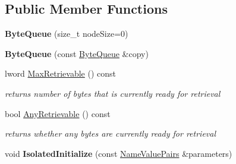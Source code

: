 \subsection*{Public Member Functions}
\begin{DoxyCompactItemize}
\item 
\hypertarget{class_byte_queue_a7c8239764938f1bb776280695e62fa0d}{
{\bfseries ByteQueue} (size\_\-t nodeSize=0)}
\label{class_byte_queue_a7c8239764938f1bb776280695e62fa0d}

\item 
\hypertarget{class_byte_queue_a0e3ec54d26a5be3b5689ca53a906622f}{
{\bfseries ByteQueue} (const \hyperlink{class_byte_queue}{ByteQueue} \&copy)}
\label{class_byte_queue_a0e3ec54d26a5be3b5689ca53a906622f}

\item 
lword \hyperlink{class_byte_queue_a56f851da4a1e9518c2b7005807aecab8}{MaxRetrievable} () const 
\begin{DoxyCompactList}\small\item\em returns number of bytes that is currently ready for retrieval \item\end{DoxyCompactList}\item 
\hypertarget{class_byte_queue_a9f509e02fb4b1f1587d6b5a001ff43f7}{
bool \hyperlink{class_byte_queue_a9f509e02fb4b1f1587d6b5a001ff43f7}{AnyRetrievable} () const }
\label{class_byte_queue_a9f509e02fb4b1f1587d6b5a001ff43f7}

\begin{DoxyCompactList}\small\item\em returns whether any bytes are currently ready for retrieval \item\end{DoxyCompactList}\item 
\hypertarget{class_byte_queue_a7e576bc7629bd0947eb098ad23b0d675}{
void {\bfseries IsolatedInitialize} (const \hyperlink{class_name_value_pairs}{NameValuePairs} \&parameters)}
\label{class_byte_queue_a7e576bc7629bd0947eb098ad23b0d675}


\end{DoxyCompactItemize}
